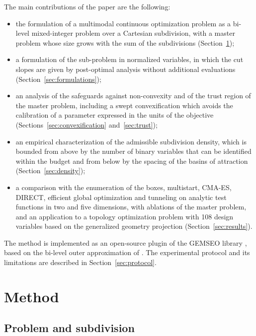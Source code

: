 \documentclass[pdflatex,sn-basic]{sn-jnl}
\begin{document}
The main contributions of the paper are the following:
\begin{itemize}
  \item the formulation of a multimodal continuous optimization problem as a
    bi-level mixed-integer problem over a Cartesian subdivision, with a master
    problem whose size grows with the sum of the subdivisions
    (Section~\ref{sec:method});
  \item a formulation of the sub-problem in normalized variables, in which the
    cut slopes are given by post-optimal analysis without additional
    evaluations (Section~\ref{sec:formulations});
  \item an analysis of the safeguards against non-convexity and of the trust
    region of the master problem, including a swept convexification which
    avoids the calibration of a parameter expressed in the units of the
    objective (Sections~\ref{sec:convexification} and~\ref{sec:trust});
  \item an empirical characterization of the admissible subdivision density,
    which is bounded from above by the number of binary variables that can be
    identified within the budget and from below by the spacing of the basins of
    attraction (Section~\ref{sec:density});
  \item a comparison with the enumeration of the boxes, multistart, CMA-ES,
    DIRECT, efficient global optimization and tunneling on analytic test
    functions in two and five dimensions, with ablations of the master problem,
    and an application to a topology optimization problem
    with 108 design variables based on the generalized geometry projection
    \citep{coniglio2020} (Section~\ref{sec:results}).
\end{itemize}

The method is implemented as an open-source plugin of the GEMSEO library
\citep{gallard2018,boxsubdivision}, based on the bi-level outer
approximation of \citet{barjhoux2022} \citep{gemseobilevel}. The experimental protocol and its
limitations are described in Section~\ref{sec:protocol}.

\section{Method}\label{sec:method}

\subsection{Problem and subdivision}
\end{document}
